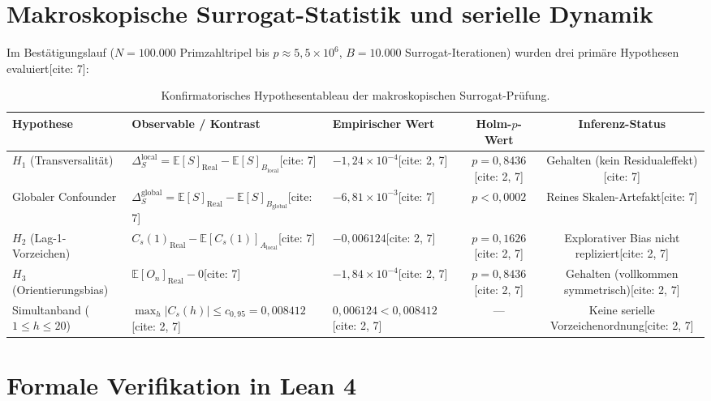 \documentclass[11pt,a4paper]{article}
\theoremstyle{definition}
\theoremstyle{remark}
\begin{document}
\section{Makroskopische Surrogat-Statistik und serielle Dynamik}

Im Bestätigungslauf ($N = 100.000$ Primzahltripel bis $p \approx 5{,}5 \times 10^6$, $B = 10.000$ Surrogat-Iterationen) wurden drei primäre Hypothesen evaluiert[cite: 7]:

\begin{table}[htbp]
\centering
\small
\begin{tabular}{lllcc}
\toprule
\textbf{Hypothese} & \textbf{Observable / Kontrast} & \textbf{Empirischer Wert} & \textbf{Holm-$p$-Wert} & \textbf{Inferenz-Status} \\
\midrule
$H_1$ (Transversalität) & $\Delta_S^{\mathrm{local}} = \mathbb{E}[S]_{\mathrm{Real}} - \mathbb{E}[S]_{B_{\mathrm{local}}}$[cite: 7] & $-1{,}24 \times 10^{-4}$[cite: 2, 7] & $p = 0{,}8436$[cite: 2, 7] & Gehalten (kein Residualeffekt)[cite: 7] \\
Globaler Confounder & $\Delta_S^{\mathrm{global}} = \mathbb{E}[S]_{\mathrm{Real}} - \mathbb{E}[S]_{B_{\mathrm{global}}}$[cite: 7] & $-6{,}81 \times 10^{-3}$[cite: 7] & $p < 0{,}0002$ & Reines Skalen-Artefakt[cite: 7] \\
$H_2$ (Lag-1-Vorzeichen) & $C_s(1)_{\mathrm{Real}} - \mathbb{E}[C_s(1)]_{A_{\mathrm{local}}}$[cite: 7] & $-0{,}006124$[cite: 2, 7] & $p = 0{,}1626$[cite: 2, 7] & Explorativer Bias nicht repliziert[cite: 2, 7] \\
$H_3$ (Orientierungsbias) & $\mathbb{E}[O_n]_{\mathrm{Real}} - 0$[cite: 7] & $-1{,}84 \times 10^{-4}$[cite: 2, 7] & $p = 0{,}8436$[cite: 2, 7] & Gehalten (vollkommen symmetrisch)[cite: 2, 7] \\
Simultanband ($1\le h\le 20$) & $\max_h |C_s(h)| \le c_{0{,}95} = 0{,}008412$[cite: 2, 7] & $0{,}006124 < 0{,}008412$[cite: 2, 7] & — & Keine serielle Vorzeichenordnung[cite: 2, 7] \\
\bottomrule
\end{tabular}
\caption{Konfirmatorisches Hypothesentableau der makroskopischen Surrogat-Prüfung.}
\end{table}

\section{Formale Verifikation in Lean 4}
\end{document}
